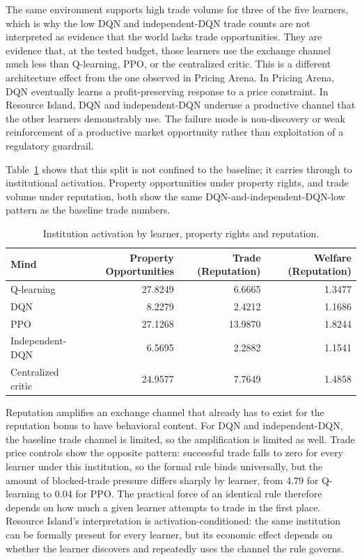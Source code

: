 \documentclass[11pt]{article}
\begin{document}
The same environment supports high trade volume for three of the five learners,
which is why the low DQN and independent-DQN trade counts are not interpreted as
evidence that the world lacks trade opportunities. They are evidence that, at
the tested budget, those learners use the exchange channel much less than
Q-learning, PPO, or the centralized critic. This is a different architecture
effect from the one observed in Pricing Arena. In Pricing Arena, DQN eventually
learns a profit-preserving response to a price constraint. In Resource Island,
DQN and independent-DQN underuse a productive channel that the other learners
demonstrably use. The failure mode is non-discovery or weak reinforcement of a
productive market opportunity rather than exploitation of a regulatory
guardrail.

Table~\ref{tab:resource-activation-by-mind} shows that this split is not
confined to the baseline; it carries through to institutional activation.
Property opportunities under property rights, and trade volume under
reputation, both show the same DQN-and-independent-DQN-low pattern as the
baseline trade numbers.

\begin{table}[h]
\centering
\begin{tabular}{lrrr}
\toprule
Mind & Property Opportunities & Trade (Reputation) & Welfare (Reputation) \\
\midrule
Q-learning & 27.8249 & 6.6665 & 1.3477 \\
DQN & 8.2279 & 2.4212 & 1.1686 \\
PPO & 27.1268 & 13.9870 & 1.8244 \\
Independent-DQN & 6.5695 & 2.2882 & 1.1541 \\
Centralized critic & 24.9577 & 7.7649 & 1.4858 \\
\bottomrule
\end{tabular}
\caption{Institution activation by learner, property rights and reputation.}
\label{tab:resource-activation-by-mind}
\end{table}

Reputation amplifies an exchange channel that already has to exist for the
reputation bonus to have behavioral content. For DQN and independent-DQN, the
baseline trade channel is limited, so the amplification is limited as well.
Trade price controls show the opposite pattern: successful trade falls to zero
for every learner under this institution, so the formal rule binds universally,
but the amount of blocked-trade pressure differs sharply by learner, from 4.79
for Q-learning to 0.04 for PPO. The practical force of an identical rule
therefore depends on how much a given learner attempts to trade in the first
place. Resource Island's interpretation is activation-conditioned:
the same institution can be formally present for every learner, but its economic
effect depends on whether the learner discovers and repeatedly uses the channel
the rule governs.
\end{document}
